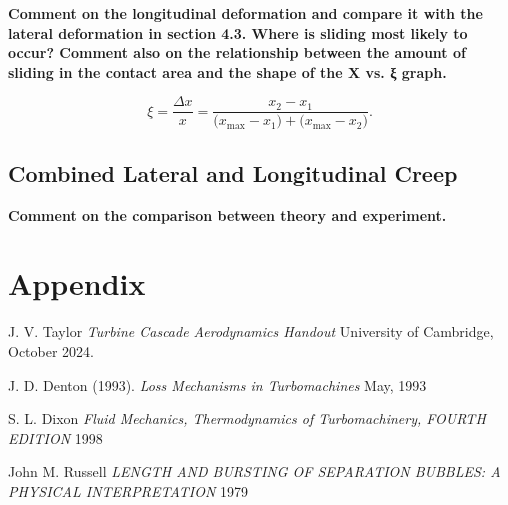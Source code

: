 \documentclass{article}
\begin{document}
\begin{center}
    \textbf{ Comment on the longitudinal deformation and compare it with the lateral deformation
    in section 4.3. Where is sliding most likely to occur? Comment also on the
    relationship between the amount of sliding in the contact area and the shape of the X
    vs.
    ξ graph.}
\end{center}



\begin{equation}
    \xi = \frac{\Delta x}{x} 
     = \frac{x_{2} - x_{1}}
            {\bigl(x_{\max} - x_{1}\bigr) + \bigl(x_{\max} - x_{2}\bigr)}.
\end{equation}

\subsection{\textbf{Combined Lateral and Longitudinal Creep}}

\begin{center}
    \textbf{Comment on the comparison between theory and experiment.}
\end{center}

\section{Appendix}

\begin{thebibliography}{9}


  J. V. Taylor
  \emph{Turbine Cascade Aerodynamics Handout}
  University of Cambridge,
  October 2024.

  J. D. Denton (1993).
  \emph{Loss Mechanisms in Turbomachines}
  May, 1993 

  S. L. Dixon
  \emph{Fluid Mechanics, Thermodynamics of Turbomachinery, FOURTH EDITION}
  1998

  John M. Russell
  \emph{LENGTH AND BURSTING OF SEPARATION BUBBLES: A PHYSICAL INTERPRETATION}
  1979
\end{thebibliography}
\end{document}
